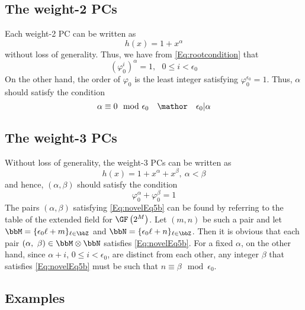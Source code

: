\subsection{The weight-2 PCs}
\label{sec:PC2}
Each weight-2 PC can be written as 
\begin{equation}
h(x)=1+x^{\alpha}
\label{eq:wt2-gen-form}
\end{equation}
without loss of generality. Thus, we have from \eqref{Eq:rootcondition} that
\begin{equation}
(\varphi_0^i)^{\alpha} =1,~~~ 0 \leq i < \epsilon_0
\label{novelEq5b}
\end{equation}
On the other hand, the order of $\varphi_0$ is the least integer satisfying $\varphi_0^{\epsilon_0} = 1$. Thus, $\alpha$ should satisfy the condition
\begin{equation}
\alpha \equiv 0 \mod \epsilon_0~~~\mathor~~~\epsilon_0|\alpha
\label{eq:wt2-alpha}
\end{equation}

\subsection{The weight-3 PCs}

Without loss of generality, the weight-3 PCs can be written as 
\begin{equation}
h(x)=1+x^{\alpha}+x^{\beta},~\alpha < \beta
\label{novelEqwt3}
\end{equation}
and hence, $(\alpha,\beta)$ should satisfy the condition
\begin{equation}
\varphi_0^{\alpha}+\varphi_0^{\beta}= 1
\label{Eq:novelEq5b}
\end{equation}
The pairs $(\alpha, \beta)$ satisfying \eqref{Eq:novelEq5b} can be found by referring to the table of the extended field for $\GF\left(2^M\right)$. 
Let $(m,n)$ be such a pair and let $\bbM=\{\epsilon_0 \ell+m\}_{\ell \in \bbZ}$ and $\bbN=\{\epsilon_0 \ell+n\}_{\ell \in \bbZ}$. Then it is obvious that each pair $(\alpha,~\beta) \in \bbM \otimes \bbN$ satisfies
\eqref{Eq:novelEq5b}. For a fixed $\alpha$, on the other hand, since $\alpha+i$, $0 \leq i < \epsilon_0$, are distinct from each other, any integer $\beta$ that satisfies \eqref{Eq:novelEq5b} must be such that $n\equiv \beta \mod \epsilon_0$.

\subsection{Examples}

